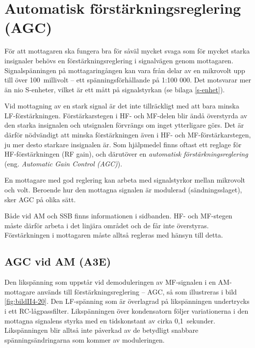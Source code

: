 \section[AGC]{Automatisk förstärknings\-reglering (AGC)}

För att mottagaren ska fungera bra för såväl mycket svaga som för mycket starka
insignaler behövs en förstärkningsreglering i signalvägen genom mottagaren.
Signalspänningen på mottagaringången kan vara från delar av en mikrovolt upp
till över 100~millivolt -- ett spänningsförhållande på 1:100 000.
Det motsvarar mer än nio S-enheter, vilket är ett mått på signalstyrkan
(se bilaga \ref{s-enhet}).

Vid mottagning av en stark signal är det inte tillräckligt med att
bara minska LF-förstärkningen.
Förstärkarstegen i HF- och MF-delen blir ändå överstyrda av den starka
insignalen och utsignalen förvrängs om inget ytterligare görs.
Det är därför nödvändigt att minska förstärkningen även i HF- och
MF-förstärkarstegen, ju mer desto starkare insignalen är.
Som hjälpmedel finns oftast ett reglage för HF-förstärkningen (RF gain), och
därutöver en \emph{automatisk förstärkningsreglering} (eng. \emph{Automatic
Gain Control (AGC)}).

En mottagare med god reglering kan arbeta med signalstyrkor mellan mikrovolt
och volt.
Beroende hur den mottagna signalen är modulerad (sändningsslaget), sker AGC
på olika sätt.

Både vid AM och SSB finns informationen i sidbanden.
HF- och MF-stegen måste därför arbeta i det linjära området och de får inte
överstyras.
Förstärkningen i mottagaren måste alltså regleras med hänsyn till detta.

\subsection{AGC vid AM (A3E)}


Den likspänning som uppstår vid demoduleringen av MF-signalen i en
AM-mottagare används till förstärkningsreglering -- AGC, så som illustreras
i bild \ref{fig:bildII4-20}.
Den LF-spänning som är överlagrad på likspänningen undertrycks i ett
RC-lågpassfilter.
Likspänningen över kondensatorn följer variationerna i den mottagna signalens
styrka med en tidskonstant av cirka 0,1~sekunder.
Likspänningen blir alltså inte påverkad av de betydligt snabbare
spänningsändringarna som kommer av moduleringen.

